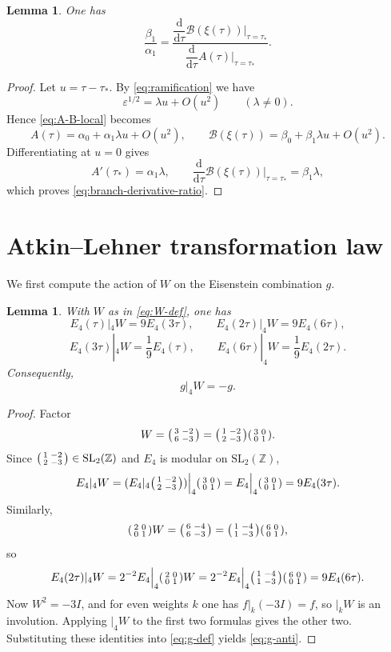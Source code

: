 \documentclass[11pt]{amsart}
\newtheorem{lemma}[theorem]{Lemma}
\theoremstyle{definition}
\theoremstyle{remark}
\newcommand{\Z}{\mathbb{Z}}
\newcommand{\dd}{\mathrm{d}}
\newcommand{\Efour}{E_4}
\newcommand{\sm}[4]{\begin{psmallmatrix}#1&#2\\#3&#4\end{psmallmatrix}}
\begin{document}
\begin{lemma}\label{lem:derivative-ratio}
One has
\begin{equation}\label{eq:branch-derivative-ratio}
\frac{\beta_1}{\alpha_1}=\frac{\dfrac{\dd}{\dd\tau}\mathcal B(\xi(\tau))\big|_{\tau=\tau_*}}{\dfrac{\dd}{\dd\tau}A(\tau)\big|_{\tau=\tau_*}}.
\end{equation}
\end{lemma}

\begin{proof}
Let $u=\tau-\tau_*$. By \eqref{eq:ramification} we have
\[
\varepsilon^{1/2}=\lambda u+O(u^2)
\qquad(\lambda\ne 0).
\]
Hence \eqref{eq:A-B-local} becomes
\[
A(\tau)=\alpha_0+\alpha_1\lambda u+O(u^2),
\qquad
\mathcal B(\xi(\tau))=\beta_0+\beta_1\lambda u+O(u^2).
\]
Differentiating at $u=0$ gives
\[
A'(\tau_*)=\alpha_1\lambda,
\qquad
\frac{\dd}{\dd\tau}\mathcal B(\xi(\tau))\Big|_{\tau=\tau_*}=\beta_1\lambda,
\]
which proves \eqref{eq:branch-derivative-ratio}.
\end{proof}

\section{Atkin--Lehner transformation law}\label{sec:AL}

We first compute the action of $W$ on the Eisenstein combination $g$.

\begin{lemma}\label{lem:E4-transform}
With $W$ as in \eqref{eq:W-def}, one has
\[
\Efour(\tau)|_4W=9\Efour(3\tau),
\qquad
\Efour(2\tau)|_4W=9\Efour(6\tau),
\]
\[
\Efour(3\tau)|_4W=\frac{1}{9}\Efour(\tau),
\qquad
\Efour(6\tau)|_4W=\frac{1}{9}\Efour(2\tau).
\]
Consequently,
\begin{equation}\label{eq:g-anti}
g|_4W=-g.
\end{equation}
\end{lemma}

\begin{proof}
Factor
\[
W=\sm{3}{-2}{6}{-3}=\sm{1}{-2}{2}{-3}\sm{3}{0}{0}{1}.
\]
Since $\sm{1}{-2}{2}{-3}\in \mathrm{SL}_2(\Z)$ and $\Efour$ is modular on $\mathrm{SL}_2(\Z)$,
\[
\Efour|_4W=(\Efour|_4\sm{1}{-2}{2}{-3})\Big|_4\sm{3}{0}{0}{1}
=\Efour\Big|_4\sm{3}{0}{0}{1}=9\Efour(3\tau).
\]
Similarly,
\[
\sm{2}{0}{0}{1}W=\sm{6}{-4}{6}{-3}=\sm{1}{-4}{1}{-3}\sm{6}{0}{0}{1},
\]
so
\[
\Efour(2\tau)|_4W
=2^{-2}\Efour\Big|_4\sm{2}{0}{0}{1}W
=2^{-2}\Efour\Big|_4\sm{1}{-4}{1}{-3}\sm{6}{0}{0}{1}
=9\Efour(6\tau).
\]
Now $W^2=-3I$, and for even weights $k$ one has $f|_k(-3I)=f$, so $|_kW$ is an involution. Applying $|_4W$ to the first two formulas gives the other two. Substituting these identities into \eqref{eq:g-def} yields \eqref{eq:g-anti}.
\end{proof}
\end{document}
